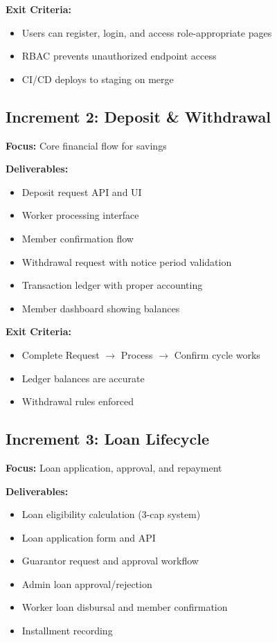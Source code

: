 \documentclass[11pt,a4paper]{article}
\begin{document}
\textbf{Exit Criteria:}
\begin{itemize}
    \item Users can register, login, and access role-appropriate pages
    \item RBAC prevents unauthorized endpoint access
    \item CI/CD deploys to staging on merge
\end{itemize}

\subsection{Increment 2: Deposit \& Withdrawal}

\textbf{Focus:} Core financial flow for savings

\textbf{Deliverables:}
\begin{itemize}
    \item Deposit request API and UI
    \item Worker processing interface
    \item Member confirmation flow
    \item Withdrawal request with notice period validation
    \item Transaction ledger with proper accounting
    \item Member dashboard showing balances
\end{itemize}

\textbf{Exit Criteria:}
\begin{itemize}
    \item Complete Request $\rightarrow$ Process $\rightarrow$ Confirm cycle works
    \item Ledger balances are accurate
    \item Withdrawal rules enforced
\end{itemize}

\subsection{Increment 3: Loan Lifecycle}

\textbf{Focus:} Loan application, approval, and repayment

\textbf{Deliverables:}
\begin{itemize}
    \item Loan eligibility calculation (3-cap system)
    \item Loan application form and API
    \item Guarantor request and approval workflow
    \item Admin loan approval/rejection
    \item Worker loan disbursal and member confirmation
    \item Installment recording
\end{itemize}
\end{document}
